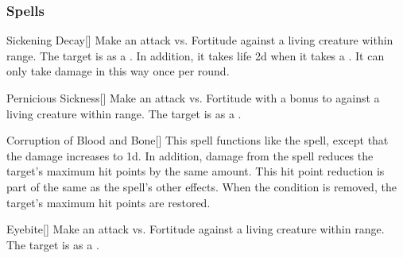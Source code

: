 \subsubsection{Spells}


\lowercase{\hypertarget{spell:Sickening Decay}{}}\label{spell:Sickening Decay}
\begin{freeability}[\nth{1}]{\hypertarget{spell:Sickening Decay}{Sickening Decay}}[]
Make an attack vs. Fortitude against a living creature within \rngclose range.
\hit The target is  as a .
In addition, it takes life  \minus2d when it takes a .
It can only take damage in this way once per round.
\end{freeability}
\vspace{0.25em}



\lowercase{\hypertarget{spell:Pernicious Sickness}{}}\label{spell:Pernicious Sickness}
\begin{freeability}[\nth{2}]{\hypertarget{spell:Pernicious Sickness}{Pernicious Sickness}}[]
Make an attack vs. Fortitude with a  bonus to  against a living creature within \rngclose range.
\hit The target is  as a .
\end{freeability}
\vspace{0.25em}



\lowercase{\hypertarget{spell:Corruption of Blood and Bone}{}}\label{spell:Corruption of Blood and Bone}
\begin{freeability}[\nth{3}]{\hypertarget{spell:Corruption of Blood and Bone}{Corruption of Blood and Bone}}[]
This spell functions like the  spell, except that the damage increases to  \minus1d.
In addition, damage from the spell reduces the target's maximum hit points by the same amount.
This hit point reduction is part of the same  as the spell's other effects.
When the condition is removed, the target's maximum hit points are restored.
\end{freeability}
\vspace{0.25em}



\lowercase{\hypertarget{spell:Eyebite}{}}\label{spell:Eyebite}
\begin{freeability}[\nth{3}]{\hypertarget{spell:Eyebite}{Eyebite}}[]
Make an attack vs. Fortitude against a living creature within \rngclose range.
\hit The target is  as a .
\end{freeability}
\vspace{0.25em}



